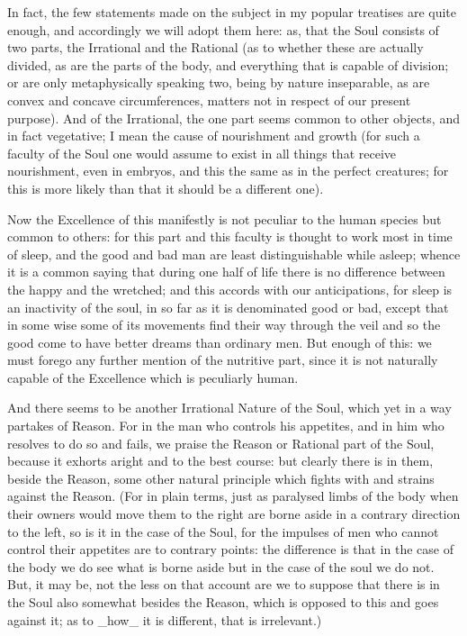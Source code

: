 In fact, the few statements made on the subject in my popular treatises
are quite enough, and accordingly we will adopt them here: as, that
the Soul consists of two parts, the Irrational and the Rational (as to
whether these are actually divided, as are the parts of the body, and
everything that is capable of division; or are only metaphysically
speaking two, being by nature inseparable, as are convex and concave
circumferences, matters not in respect of our present purpose). And of
the Irrational, the one part seems common to other objects, and in fact
vegetative; I mean the cause of nourishment and growth (for such a
faculty of the Soul one would assume to exist in all things that receive
nourishment, even in embryos, and this the same as in the perfect
creatures; for this is more likely than that it should be a different
one).

Now the Excellence of this manifestly is not peculiar to the human
species but common to others: for this part and this faculty is thought
to work most in time of sleep, and the good and bad man are least
distinguishable while asleep; whence it is a common saying that during
one half of life there is no difference between the happy and the
wretched; and this accords with our anticipations, for sleep is an
inactivity of the soul, in so far as it is denominated good or bad,
except that in some wise some of its movements find their way through
the veil and so the good come to have better dreams than ordinary men.
But enough of this: we must forego any further mention of the nutritive
part, since it is not naturally capable of the Excellence which is
peculiarly human.

And there seems to be another Irrational Nature of the Soul, which yet
in a way partakes of Reason. For in the man who controls his appetites,
and in him who resolves to do so and fails, we praise the Reason or
Rational part of the Soul, because it exhorts aright and to the best
course: but clearly there is in them, beside the Reason, some other
natural principle which fights with and strains against the Reason. (For
in plain terms, just as paralysed limbs of the body when their owners
would move them to the right are borne aside in a contrary direction to
the left, so is it in the case of the Soul, for the impulses of men who
cannot control their appetites are to contrary points: the difference is
that in the case of the body we do see what is borne aside but in the
case of the soul we do not. But, it may be, not the less on that account
are we to suppose that there is in the Soul also somewhat besides the
Reason, which is opposed to this and goes against it; as to _how_ it is
different, that is irrelevant.)


